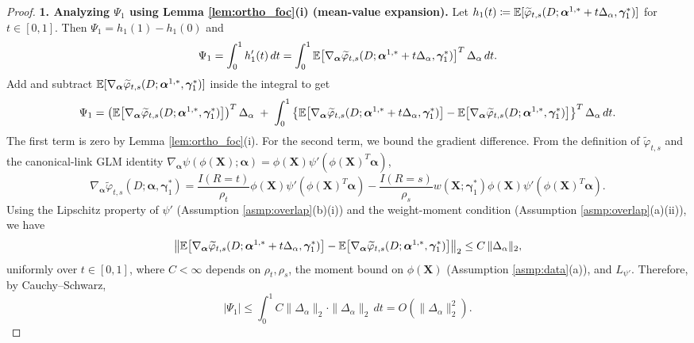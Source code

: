 \documentclass{article}
\begin{document}
\begin{proof}

\textbf{1. Analyzing $\Psi_1$ using Lemma \ref{lem:ortho_foc}(i) (mean-value expansion).}
Let $h_1(t)\coloneqq \operatorname{\mathbb{E}}[\widetilde{\varphi}_{t,s}(D;\boldsymbol{\alpha}^{1,*}+t\Delta_\alpha,\boldsymbol{\gamma}_1^*)]$ for $t\in[0,1]$.
Then $\Psi_1=h_1(1)-h_1(0)$ and
\[
\Psi_1
=
\int_0^1 h_1'(t)\,dt
=
\int_0^1 \operatorname{\mathbb{E}}\!\left[\nabla_{\boldsymbol{\alpha}}\widetilde{\varphi}_{t,s}(D;\boldsymbol{\alpha}^{1,*}+t\Delta_\alpha,\boldsymbol{\gamma}_1^*)\right]^T\Delta_\alpha\,dt.
\]
Add and subtract $\operatorname{\mathbb{E}}[\nabla_{\boldsymbol{\alpha}}\widetilde{\varphi}_{t,s}(D;\boldsymbol{\alpha}^{1,*},\boldsymbol{\gamma}_1^*)]$ inside the integral to get
\[
\Psi_1
=
\left(\operatorname{\mathbb{E}}\!\left[\nabla_{\boldsymbol{\alpha}}\widetilde{\varphi}_{t,s}(D;\boldsymbol{\alpha}^{1,*},\boldsymbol{\gamma}_1^*)\right]\right)^T\Delta_\alpha
\;+\;
\int_0^1\left\{\operatorname{\mathbb{E}}\!\left[\nabla_{\boldsymbol{\alpha}}\widetilde{\varphi}_{t,s}(D;\boldsymbol{\alpha}^{1,*}+t\Delta_\alpha,\boldsymbol{\gamma}_1^*)\right]
-\operatorname{\mathbb{E}}\!\left[\nabla_{\boldsymbol{\alpha}}\widetilde{\varphi}_{t,s}(D;\boldsymbol{\alpha}^{1,*},\boldsymbol{\gamma}_1^*)\right]\right\}^T\Delta_\alpha\,dt.
\]
The first term is zero by Lemma \ref{lem:ortho_foc}(i). For the second term, we bound the gradient difference.
From the definition of $\widetilde{\varphi}_{t,s}$ and the canonical-link GLM identity
$\nabla_{\boldsymbol{\alpha}}\psi(\phi(\boldsymbol{X});\boldsymbol{\alpha})=\phi(\boldsymbol{X})\psi'(\phi(\boldsymbol{X})^T\boldsymbol{\alpha})$,
\[
\nabla_{\boldsymbol{\alpha}}\widetilde{\varphi}_{t,s}(D;\boldsymbol{\alpha},\boldsymbol{\gamma}_1^*)
=
\frac{I(R=t)}{\rho_t}\phi(\boldsymbol{X})\psi'(\phi(\boldsymbol{X})^T\boldsymbol{\alpha})
-\frac{I(R=s)}{\rho_s}w(\boldsymbol{X};\boldsymbol{\gamma}_1^*)\phi(\boldsymbol{X})\psi'(\phi(\boldsymbol{X})^T\boldsymbol{\alpha}).
\]
Using the Lipschitz property of $\psi'$ (Assumption \ref{asmp:overlap}(b)(i)) and the weight-moment condition (Assumption \ref{asmp:overlap}(a)(ii)), we have
\[
\left\|
\operatorname{\mathbb{E}}\!\left[\nabla_{\boldsymbol{\alpha}}\widetilde{\varphi}_{t,s}(D;\boldsymbol{\alpha}^{1,*}+t\Delta_\alpha,\boldsymbol{\gamma}_1^*)\right]
-\operatorname{\mathbb{E}}\!\left[\nabla_{\boldsymbol{\alpha}}\widetilde{\varphi}_{t,s}(D;\boldsymbol{\alpha}^{1,*},\boldsymbol{\gamma}_1^*)\right]
\right\|_2
\le
C\,\|\Delta_\alpha\|_2,
\]
uniformly over $t\in[0,1]$, where $C<\infty$ depends on $\rho_t,\rho_s$, the moment bound on $\phi(\boldsymbol{X})$ (Assumption \ref{asmp:data}(a)), and $L_{\psi'}$.
Therefore, by Cauchy--Schwarz,
\[
|\Psi_1|
\le
\int_0^1 C\|\Delta_\alpha\|_2 \cdot \|\Delta_\alpha\|_2\,dt
=
O(\|\Delta_\alpha\|_2^2).
\]


\end{proof}
\end{document}
